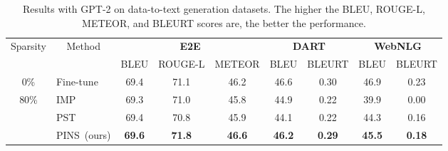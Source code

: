 \begin{table}[t]
	\centering
	\small
	\begin{tabular}{c|l|ccc|cc|cc}
		\toprule
		\multirow{2}{*}{Sparsity} & \multicolumn{1}{c|}{\multirow{2}{*}{Method}} & \multicolumn{3}{c|}{\textbf{E2E}}                                                             & \multicolumn{2}{c|}{\textbf{DART}}                                                        & \multicolumn{2}{c}{\textbf{WebNLG}}                                                      \\
		& \multicolumn{1}{c|}{}                        & \multicolumn{1}{l}{BLEU} & \multicolumn{1}{l}{ROUGE-L} & \multicolumn{1}{l|}{METEOR} & \multicolumn{1}{l}{BLEU} & \multicolumn{1}{l|}{BLEURT} & \multicolumn{1}{l}{BLEU} & \multicolumn{1}{l}{BLEURT} \\
		\midrule
		0\%                       & Fine-tune                                   & 69.4                     & 71.1                        & 46.2                       & 46.6                                        & 0.30                       & 46.9                                       & 0.23                       \\
		\midrule
		\multirow{3}{*}{80\%}     & IMP                                         & 69.3                     & 71.0                        & 45.8                       & 44.9                                   & 0.22                       & 39.9                                      & 0.00                       \\
		& PST                                         & 69.4                     & 70.8                        & 45.9                       & 44.1                                  & 0.22                       & 44.3                                   & 0.16                       \\
		& PINS~(ours)                                        & \textbf{69.6}                     & \textbf{71.8}                        & \textbf{46.6}                       & \textbf{46.2}                                       & \textbf{0.29}                       & \textbf{45.5}                                       & \textbf{0.18}                       \\
		\bottomrule
	\end{tabular}
	\caption{Results with GPT-2 on data-to-text generation datasets.  The higher the BLEU, ROUGE-L, METEOR, and BLEURT scores are, the better the performance.}
	\label{table:dtt}
\end{table}
